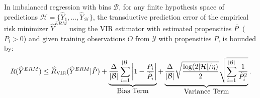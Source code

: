 \begin{theorem} 
In imbalanced regression with bins $\mathcal{B}$, for any finite hypothesis space of predictions $\mathcal{H} = \{\hat{Y}_{1}, \dots, \hat{Y}_{\mathcal{H}}\}$, the transductive prediction error of the empirical risk minimizer $\hat{Y}^{ERM}$ using the VIR estimator with estimated propensities $\Tilde{P}$ ($P_{i} > 0$) and given training observations $O$ from $\mathcal{Y}$ with propensities $P$, is bounded by:
%
\begin{align}
     R (\hat{Y}^{ERM}) \leq \hat{R}_{\textsc{VIR}}(\hat{Y}^{ERM} | \Tilde{P}) + \underbrace{\dfrac{\Delta}{|\mathcal{B}|} \sum_{i=1}^{|\mathcal{B}|} \bigg| 1 - \dfrac{P_{i}}{\Tilde{P}_{i}} \bigg|}_{\mbox{Bias Term}} + \underbrace{\dfrac{\Delta}{|\mathcal{B}|} \sqrt{\dfrac{\log (2 |\mathcal{H}| / \eta)}{2}} \sqrt{\sum_{i=1}^{|\mathcal{B}|} \dfrac{1}{\Tilde{P}_{i}^{2}}}}_{\mbox{Variance Term}}.
\end{align}
%
\end{theorem}
%
%

